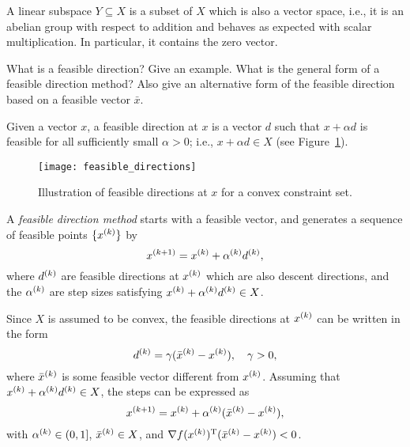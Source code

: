 \documentclass{article}
\begin{document}
A linear subspace \(Y \subseteq X\) is a subset of \(X\) which is also a vector space, i.e., it is
an abelian group with respect to addition and behaves as expected with scalar multiplication.  In
particular, it contains the zero vector.

\begin{question}
  What is a feasible direction? Give an example.  What is the general form of a feasible direction
  method? Also give an alternative form of the feasible direction based on a feasible vector
  \(\bar{x}\).
\end{question}

Given a vector \(x\), a feasible direction at \(x\) is a vector \(d\) such that \(x + \alpha d\) is
feasible for all sufficiently small \(\alpha > 0\); i.e., \(x + \alpha d \in X\) (see
Figure~\ref{fig:feasible-directions}).

\begin{figure}[H]
  \centering
  \texttt{[image: feasible\_directions]}
  \caption{Illustration of feasible directions at \(x\) for a convex constraint
    set.\label{fig:feasible-directions}}
\end{figure}

A \emph{feasible direction method} starts with a feasible vector, and generates a sequence of
feasible points \(\{\kth{x}\}\) by
\begin{equation*}
  \kth[k+1]{x} = \kth{x} + \kth{\alpha}\kth{d},
\end{equation*}
where \(\kth{d}\) are feasible directions at \(\kth{x}\) which are also descent directions, and the
\(\kth{\alpha}\) are step sizes satisfying \(\kth{x} + \kth{\alpha} \kth{d} \in X\).

Since \(X\) is assumed to be convex, the feasible directions at \(\kth{x}\) can be written in the
form
\begin{equation*}
  \kth{d} = \gamma(\kth{\bar{x}} - \kth{x}), \quad \gamma > 0,
\end{equation*}
where \(\kth{\bar{x}}\) is some feasible vector different from \(\kth{x}\).  Assuming that
\(\kth{x} + \kth{\alpha} \kth{d} \in X\), the steps can be expressed as
\begin{equation*}
  \kth[k+1]{x} = \kth{x} + \kth{\alpha}(\kth{\bar{x}} - \kth{x}),
\end{equation*}
with \(\kth{\alpha} \in (0, 1]\), \(\kth{\bar{x}} \in X\), and
\(\T{\nabla f(\kth{x})}(\kth{\bar{x}} - \kth{x}) < 0\).
\end{document}
